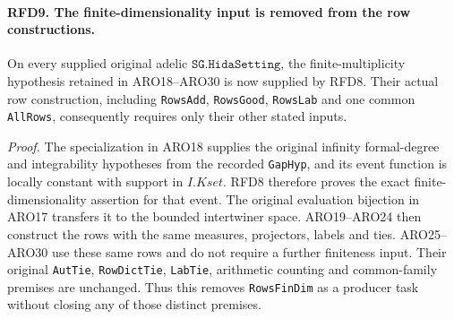 \paragraph{RFD9. The finite-dimensionality input is removed from the row constructions.}
\label{claim:RFD9}
On every supplied original adelic \(\texttt{SG.HidaSetting}\),
the finite-multiplicity hypothesis retained in ARO18--ARO30 is
now supplied by RFD8.  Their actual row construction, including
\texttt{RowsAdd}, \texttt{RowsGood}, \texttt{RowsLab} and one
common \texttt{AllRows}, consequently requires only their other
stated inputs.

\emph{Proof.}
The specialization in ARO18 supplies the original infinity
formal-degree and integrability hypotheses from the recorded
\texttt{GapHyp}, and its event function is locally constant
with support in \(I.Kset\).  RFD8 therefore proves the exact
finite-dimensionality assertion for that event.  The original
evaluation bijection in ARO17 transfers it to the bounded
intertwiner space.  ARO19--ARO24 then construct the rows with
the same measures, projectors, labels and ties.  ARO25--ARO30
use these same rows and do not require a further finiteness
input.  Their original \texttt{AutTie}, \texttt{RowDictTie},
\texttt{LabTie}, arithmetic counting and common-family premises
are unchanged.  Thus this removes \texttt{RowsFinDim} as a
producer task without closing any of those distinct premises.
